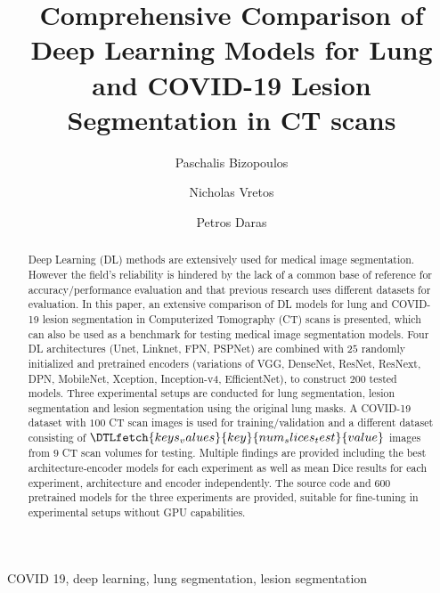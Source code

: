 \documentclass{elsarticle}
\begin{document}

\title{Comprehensive Comparison of Deep Learning Models for Lung and COVID-19 Lesion Segmentation in CT scans}
\author[1]{Paschalis Bizopoulos}
\author[1]{Nicholas Vretos}
\author[1]{Petros Daras}

\address[1]{Visual Computing Lab of the Information Technologies Institute, Centre for Research and Technology Hellas, Thessaloniki, Greece e-mail: \{pbizopoulos,vretos,daras\}@iti.gr}

\begin{abstract}
	Deep Learning (DL) methods are extensively used for medical image segmentation.
	However the field's reliability is hindered by the lack of a common base of reference for accuracy/performance evaluation and that previous research uses different datasets for evaluation.
	In this paper, an extensive comparison of DL models for lung and COVID-19 lesion segmentation in Computerized Tomography (CT) scans is presented, which can also be used as a benchmark for testing medical image segmentation models.
	Four DL architectures (Unet, Linknet, FPN, PSPNet) are combined with $25$ randomly initialized and pretrained encoders (variations of VGG, DenseNet, ResNet, ResNext, DPN, MobileNet, Xception, Inception-v4, EfficientNet), to construct $200$ tested models.
	Three experimental setups are conducted for lung segmentation, lesion segmentation and lesion segmentation using the original lung masks.
	A COVID-19 dataset with $100$ CT scan images is used for training/validation and a different dataset consisting of $\DTLfetch{keys_values}{key}{num_slices_test}{value}$ images from $9$ CT scan volumes for testing.
	Multiple findings are provided including the best architecture-encoder models for each experiment as well as mean Dice results for each experiment, architecture and encoder independently.
	The source code and $600$ pretrained models for the three experiments are provided, suitable for fine-tuning in experimental setups without GPU capabilities.
\end{abstract}

\begin{keyword}
	COVID 19, deep learning, lung segmentation, lesion segmentation
\end{keyword}

\maketitle
\end{document}
